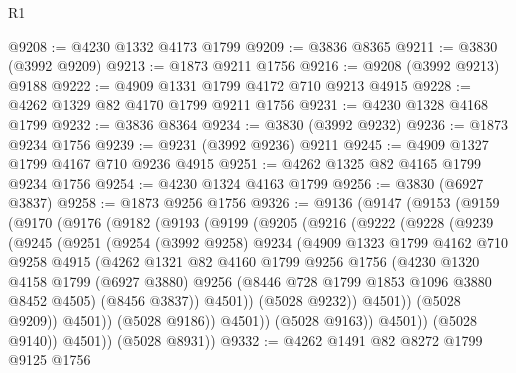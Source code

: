 \begin{lexlean}{R1}
\begin{coremodule}
@9208 := @4230 @1332 @4173 @1799
@9209 := @3836 @8365
@9211 := @3830 (@3992 @9209)
@9213 := @1873 @9211 @1756
@9216 := @9208 (@3992 @9213) @9188
@9222 := @4909 @1331 @1799 @4172 @710 @9213 @4915
@9228 := @4262 @1329 @82 @4170 @1799 @9211 @1756
@9231 := @4230 @1328 @4168 @1799
@9232 := @3836 @8364
@9234 := @3830 (@3992 @9232)
@9236 := @1873 @9234 @1756
@9239 := @9231 (@3992 @9236) @9211
@9245 := @4909 @1327 @1799 @4167 @710 @9236 @4915
@9251 := @4262 @1325 @82 @4165 @1799 @9234 @1756
@9254 := @4230 @1324 @4163 @1799
@9256 := @3830 (@6927 @3837)
@9258 := @1873 @9256 @1756
@9326 := @9136
    (@9147
      (@9153
        (@9159
          (@9170
            (@9176
              (@9182
                (@9193
                  (@9199
                    (@9205
                      (@9216
                        (@9222
                          (@9228
                            (@9239
                              (@9245
                                (@9251
                                  (@9254
                                    (@3992 @9258)
                                    @9234
                                    (@4909
                                      @1323
                                      @1799
                                      @4162
                                      @710
                                      @9258
                                      @4915
                                      (@4262
                                        @1321
                                        @82
                                        @4160
                                        @1799
                                        @9256
                                        @1756
                                        (@4230
                                          @1320
                                          @4158
                                          @1799
                                          (@6927 @3880)
                                          @9256
                                          (@8446 @728 @1799 @1853 @1096 @3880 @8452 @4505)
                                          (@8456 @3837))
                                        @4501))
                                    (@5028 @9232))
                                  @4501))
                              (@5028 @9209))
                            @4501))
                        (@5028 @9186))
                      @4501))
                  (@5028 @9163))
                @4501))
            (@5028 @9140))
          @4501))
      (@5028 @8931))
@9332 := @4262 @1491 @82 @8272 @1799 @9125 @1756

\end{coremodule}
\end{lexlean}
